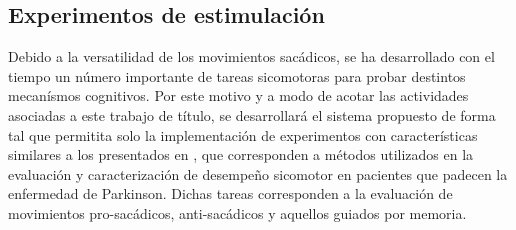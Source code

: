 \documentclass[../main.tex]{subfiles}
\begin{document}
			\begin{table}[H]\begin{center}\end{center}\end{table}

		\newpage
		\subsection{Experimentos de estimulación}
		\label{sub:02_experimentos_de_estimulacion}

			Debido a la versatilidad de los movimientos sacádicos, se ha desarrollado con el tiempo un número importante de tareas sicomotoras para probar destintos mecanísmos cognitivos. Por este motivo y a modo de acotar las actividades asociadas a este trabajo de título, se desarrollará el sistema propuesto de forma tal que permitita solo la implementación de experimentos con características similares a los presentados en \cite{article:tests_1, article:tests_2, article:tests_3, article:tests_4}, que corresponden a métodos utilizados en la evaluación y caracterización de desempeño sicomotor en pacientes que padecen la enfermedad de Parkinson. Dichas tareas corresponden a la evaluación de movimientos pro-sacádicos, anti-sacádicos y aquellos guiados por memoria.
\end{document}

